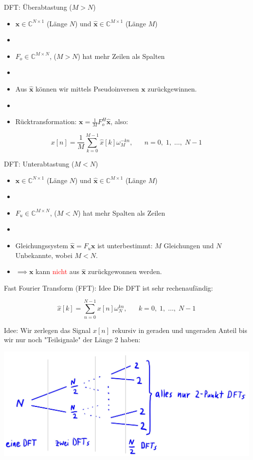 \documentclass[14pt, aspectratio=169, handout]{beamer}
\begin{document}
\begin{frame}{DFT: Überabtastung ($M>N$)}
    \begin{itemize}
        \item $\mathbf{x} \in \mathbb{C}^{N \times 1}$ (Länge $N$) und $\hat{\mathbf{x}} \in \mathbb{C}^{M \times 1}$ (Länge $M$)
        \item[] 
        \item $F_o \in \mathbb{C}^{M\times N}$, ($M > N$) hat mehr Zeilen als Spalten
        \item[] 
        \item Aus $\hat{\mathbf{x}}$ können wir mittels Pseudoinversen $\mathbf{x}$ zurückgewinnen.
        \item[] 
        \item Rücktransformation: $\mathbf{x} = \displaystyle\frac{1}{M} F_o^H \hat{\mathbf{x}}$, also:
    \end{itemize}
    $$x[n] = \frac{1}{M} \sum_{k=0}^{M-1} \hat{x}[k]\omega_M^{-kn}, \hspace{20pt} n = 0, \; 1, \; \dots, \; N-1$$
\end{frame}

\begin{frame}{DFT: Unterabtastung ($M<N$)}
    \begin{itemize}
        \item $\mathbf{x} \in \mathbb{C}^{N \times 1}$ (Länge $N$) und $\hat{\mathbf{x}} \in \mathbb{C}^{M \times 1}$ (Länge $M$)
        \item[] 
        \item $F_u \in \mathbb{C}^{M\times N}$, ($M < N$) hat mehr Spalten als Zeilen
        \item[] 
        \item Gleichungssystem $\hat{\mathbf{x}} = F_u \mathbf{x}$ ist unterbestimmt: $M$ Gleichungen und $N$ Unbekannte, wobei $M < N$.
        \item[] $\implies \mathbf{x}$ kann \textcolor{red}{nicht} aus $\hat{\mathbf{x}}$ zurückgewonnen werden.
    \end{itemize}
\end{frame}

\begin{frame}{Fast Fourier Transform (FFT): Idee}
    Die DFT ist sehr rechenaufändig:

    $$\hat{x}[k] = \sum_{n=0}^{N-1} x[n]\omega_N^{kn}, \hspace{20pt} k=0, \; 1, \; \dots, \; N-1$$

    Idee: Wir zerlegen das Signal $x[n]$ rekursiv in geraden und ungeraden Anteil bis wir nur noch "Teilsignale" der Länge 2 haben:

    \begin{center}
        \includegraphics[width=0.5\linewidth]{figures/Rekursionsbaum.jpeg}
    \end{center}
\end{frame}
\end{document}
